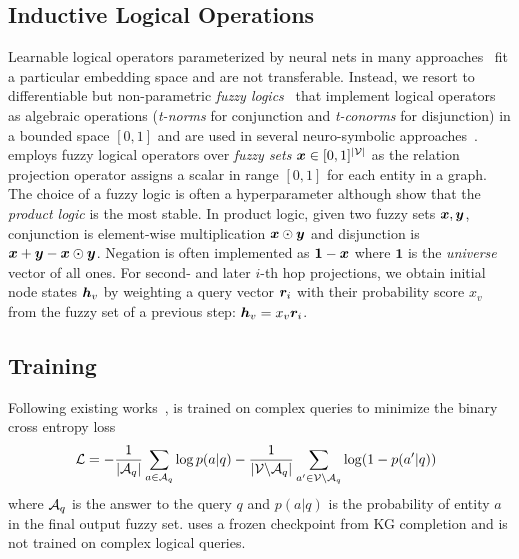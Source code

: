 \subsection{Inductive Logical Operations}
\label{subsec:logic_ops}

Learnable logical operators parameterized by neural nets in many \clqa approaches~\cite{gqe,q2b,cone,mlpmix} fit a particular embedding space and are not transferable.
Instead, we resort to differentiable but non-parametric \emph{fuzzy logics}~\citep{vankrieken_fuzzy} that implement logical operators as algebraic operations (\emph{t-norms} for conjunction and \emph{t-conorms} for disjunction) in a bounded space $[0,1]$ and are used in several neuro-symbolic \clqa approaches~\citep{cqd, gnn_qe, cqda, qto, fit}. 
\method employs fuzzy logical operators over \emph{fuzzy sets} ${\bm{x}} \in [0,1]^{|{\mathcal{V}}|}$ as the relation projection operator assigns a scalar in range $[0,1]$ for each entity in a graph. 
The choice of a fuzzy logic is often a hyperparameter although \citet{vankrieken_fuzzy} show that the \emph{product logic} is the most stable. 
In product logic, given two fuzzy sets ${\bm{x}}, {\bm{y}}$, conjunction is element-wise multiplication ${\bm{x}} \odot {\bm{y}}$ and disjunction is ${\bm{x}} + {\bm{y}} - {\bm{x}} \odot {\bm{y}}$.
Negation is often implemented as $\mathbf{1}-{\bm{x}}$ where $\mathbf{1}$ is the \emph{universe} vector of all ones.
For second- and later $i$-th hop projections, we obtain initial node states ${\bm{h}}_v$ by weighting a query vector ${\bm{r}}_i$ with their probability score $x_v$ from the fuzzy set of a previous step: ${\bm{h}}_v = x_v {\bm{r}}_i$.


\subsection{Training}
Following existing works~\citep{betae,gnn_qe}, \method is trained on complex queries to minimize the binary cross entropy loss
\begin{align}
\hspace{-0.5em}\displaystyle{
        {\mathcal{L}}= -\frac{1}{|{\mathcal{A}}_{q}|}\sum_{a \in {\mathcal{A}}_{q}}\log p(a|q) 
              -\frac{1}{|{\mathcal{V}}\backslash{\mathcal{A}}_{q}|}\sum_{a' \in {\mathcal{V}}\backslash{\mathcal{A}}_{q}}\log (1 - p(a'|q))}
    \label{eqn:loss}
\end{align}
where ${\mathcal{A}}_{q}$ is the answer to the query $q$ and $p(a|q)$ is the probability of entity $a$ in the final output fuzzy set.
\methodlp uses a frozen checkpoint from KG completion and is not trained on complex logical queries.


